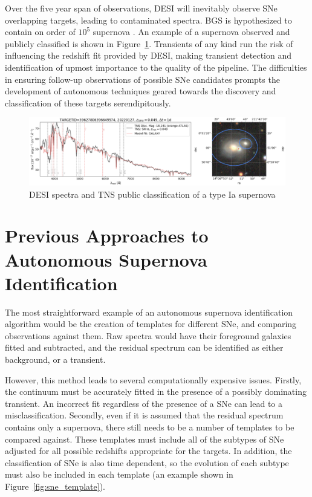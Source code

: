 Over the five year span of observations, DESI will inevitably observe SNe overlapping targets, leading to 
contaminated spectra. BGS is hypothesized to contain on order of $10^5$ supernova 
\parencite{desicollaboration2016}. An example of a supernova observed and publicly classified is shown in 
Figure~\ref{fig:desi_supernova}. Transients of any kind run the risk of influencing the redshift fit provided by DESI, 
making transient detection and identification of upmost importance to the quality of the pipeline.
The difficulties in ensuring follow-up observations of possible SNe candidates prompts the development of 
autonomous techniques geared towards the discovery and classification of these targets serendipitously. 

\begin{figure}
    \centering
    \includegraphics[width=\textwidth]{figures/desi_figures/SNe_Detection.png}
    \caption[Publicly Classified SNe captured by DESI]{DESI spectra and TNS public 
    classification of a type Ia supernova }
    \label{fig:desi_supernova}
\end{figure}

\section{Previous Approaches to Autonomous Supernova Identification}
\label{sec:PrevApproach}
The most straightforward example of an autonomous supernova identification algorithm would 
be the creation of templates for different SNe, and comparing observations against them. Raw spectra would have 
their foreground galaxies fitted and subtracted, and the residual spectrum can be identified as either background, 
or a transient.

However, this method leads to several computationally expensive issues. Firstly, the continuum 
must be accurately fitted in the presence of a possibly dominating transient. An incorrect fit 
regardless of the presence of a SNe can lead to a misclassification. Secondly, even if 
it is assumed that the residual spectrum contains only a supernova, there still needs to be 
a number of templates to be compared against. These templates must include all of the subtypes of 
SNe adjusted for all possible redshifts appropriate for the targets. In addition, the classification of 
SNe is also time dependent, so the evolution of each subtype must also be included in each template (an 
example shown in Figure~\ref{fig:sne_template}).

